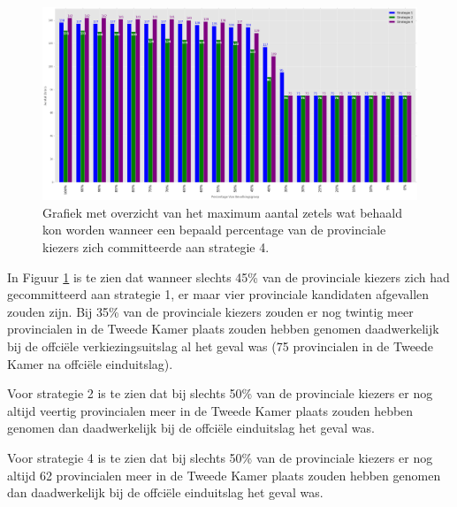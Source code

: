 \begin{figure}[H]


	\includegraphics[width=\linewidth]{percentages_van_provincialenS1S2S4.png}

			\caption{Grafiek met overzicht van het maximum aantal zetels wat behaald kon worden wanneer een bepaald percentage van de provinciale kiezers zich committeerde aan strategie 4.}

\label{fig:PerP}
\end{figure}

In Figuur \ref{fig:PerP} is te zien dat wanneer slechts 45\% van de provinciale kiezers zich had gecommitteerd aan strategie 1, er maar vier provinciale kandidaten afgevallen zouden zijn. Bij 35\% van de provinciale kiezers zouden er nog twintig meer provincialen in de Tweede Kamer plaats zouden hebben genomen daadwerkelijk bij de offci\"{e}le verkiezingsuitslag al het geval was (75 provincialen in de Tweede Kamer na offci\"{e}le einduitslag).

Voor strategie 2 is te zien dat bij slechts 50\% van de provinciale kiezers er nog altijd veertig provincialen meer in de Tweede Kamer plaats zouden hebben genomen dan daadwerkelijk bij de offci\"{e}le einduitslag het geval was.

Voor strategie 4 is te zien dat bij slechts 50\% van de provinciale kiezers er nog altijd 62 provincialen meer in de Tweede Kamer plaats zouden hebben genomen dan daadwerkelijk bij de offci\"{e}le einduitslag het geval was. 

 




